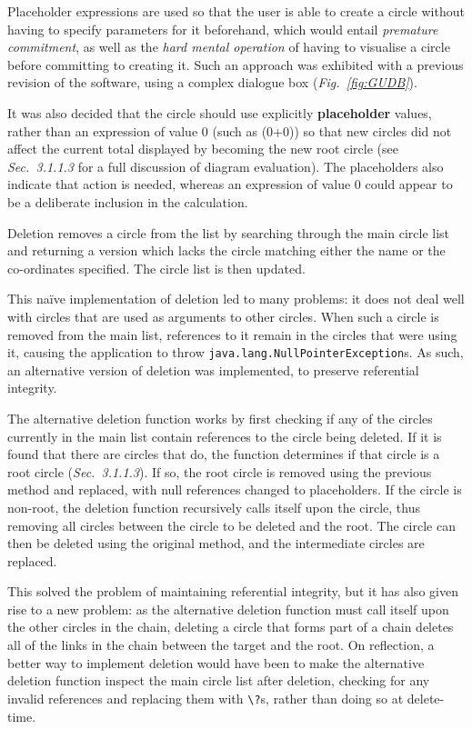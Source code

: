 \documentclass[12pt,twoside,notitlepage,xetex]{report}
\begin{document}
Placeholder expressions are used so that the user is able to create a circle without having to specify parameters for it beforehand, which would entail \emph{premature commitment}, as well as the \emph{hard mental operation} of having to visualise a circle before committing to creating it.  Such an approach was exhibited with a previous revision of the software, using a complex dialogue box (\emph{Fig.~\ref{fig:GUDB}}).

It was also decided that the circle should use explicitly {\bf placeholder} values, rather than an expression of value 0 (such as (0+0)) so that new circles did not affect the current total displayed by becoming the new root circle (see \emph{Sec.~3.1.1.3} for a full discussion of diagram evaluation).  The placeholders also indicate that action is needed, whereas an expression of value 0 could appear to be a deliberate inclusion in the calculation.

Deletion removes a circle from the list by searching through the main circle list and returning a version which lacks the circle matching either the name or the co-ordinates specified.  The circle list is then updated.

This naïve implementation of deletion led to many problems: it does not deal well with circles that are used as arguments to other circles.  When such a circle is removed from the main list, references to it remain in the circles that were using it, causing the application to throw \verb¬java.lang.NullPointerException¬s.  As such, an alternative version of deletion was implemented, to preserve referential integrity.

The alternative deletion function works by first checking if any of the circles currently in the main list contain references to the circle being deleted.  If it is found that there are circles that do, the function determines if that circle is a root circle (\emph{Sec.~3.1.1.3}).  If so, the root circle is removed using the previous method and replaced, with null references changed to placeholders.  If the circle is non-root, the deletion function recursively calls itself upon the circle, thus removing all circles between the circle to be deleted and the root.  The circle can then be deleted using the original method, and the intermediate circles are replaced.

This solved the problem of maintaining referential integrity, but it has also given rise to a new problem: as the alternative deletion function must call itself upon the other circles in the chain, deleting a circle that forms part of a chain deletes all of the links in the chain between the target and the root.  On reflection, a better way to implement deletion would have been to make the alternative deletion function inspect the main circle list after deletion, checking for any invalid references and replacing them with \verb¬\?¬s, rather than doing so at delete-time.
\end{document}

